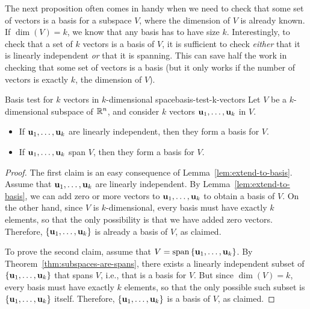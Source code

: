 The next proposition often comes in handy when we need to check that
some set of vectors is a basis for a subspace $V$, where the dimension
of $V$ is already known. If $\dim(V)=k$, we know that any basis has to
have size $k$. Interestingly, to check that a set of $k$ vectors is a
basis of $V$, it is sufficient to check {\em either} that it is
linearly independent {\em or} that it is spanning. This can save half
the work in checking that some set of vectors is a basis (but it only
works if the number of vectors is exactly $k$, the dimension of $V$).

\begin{proposition}{Basis test for $k$ vectors in $k$-dimensional space}{basis-test-k-vectors}
  Let $V$ be a $k$-dimensional subspace of $\mathbb{R}^n$, and consider $k$
  vectors $\mbox{\bf u}_{1},\ldots,\mbox{\bf u}_{k}$ in $V$.
  \begin{itemize}
  \item If $\mbox{\bf u}_{1},\ldots,\mbox{\bf u}_{k}$ are linearly
    independent, then they form a basis for $V$.
  \item If $\mbox{\bf u}_{1},\ldots,\mbox{\bf u}_{k}$ span $V$, then they
    form a basis for $V$.
  \end{itemize}
\end{proposition}

\begin{proof}
  The first claim is an easy consequence of
  Lemma~\ref{lem:extend-to-basis}. Assume that
  $\mbox{\bf u}_{1},\ldots,\mbox{\bf u}_{k}$ are linearly independent. By
  Lemma~\ref{lem:extend-to-basis}, we can add zero or more vectors to
  $\mbox{\bf u}_{1},\ldots,\mbox{\bf u}_{k}$ to obtain a basis of $V$. On the
  other hand, since $V$ is $k$-dimensional, every basis must have
  exactly $k$ elements, so that the only possibility is that we have
  added zero vectors. Therefore,
  $\left\{\mbox{\bf u}_{1},\ldots,\mbox{\bf u}_{k}\right\}$ is already a basis of $V$,
  as claimed.

  To prove the second claim, assume that
  $V=\sspan\set{\vect{u}_{1},\ldots,\vect{u}_{k}}$. By
  Theorem~\ref{thm:subspaces-are-spans}, there exists a linearly
  independent subset of $\left\{\mbox{\bf u}_{1},\ldots,\mbox{\bf u}_{k}\right\}$ that
  spans $V$, i.e., that is a basis for $V$. But since $\dim(V)=k$,
  every basis must have exactly $k$ elements, so that the only
  possible such subset is $\left\{\mbox{\bf u}_{1},\ldots,\mbox{\bf u}_{k}\right\}$
  itself. Therefore, $\left\{\mbox{\bf u}_{1},\ldots,\mbox{\bf u}_{k}\right\}$ is a
  basis of $V$, as claimed.
\end{proof}

